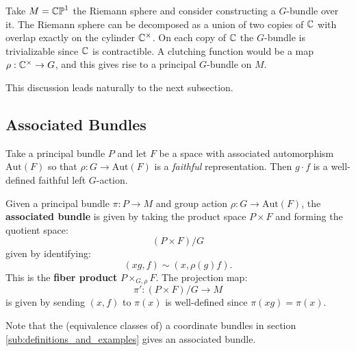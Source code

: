 		\begin{eg}
			Take $M = \mathbb{CP}^1$ the Riemann sphere and consider constructing a $G$-bundle over it. The Riemann sphere can be decomposed as a union of two copies of $\mathbb{C}$ with overlap exactly on the cylinder $\mathbb{C}^{\times}$. On each copy of $\mathbb{C}$ the $G$-bundle is trivializable since $\mathbb{C}$ is contractible. A clutching function would be a map $\rho: \mathbb{C}^\times \to G$, and this gives rise to a principal $G$-bundle on $M$. 
		\end{eg}
		
		This discussion leads naturally to the next subsection. 
		
		
		\subsection{Associated Bundles}
		Take a principal bundle $P$ and let $F$ be a space with associated automorphism $\mathrm{Aut}(F)$ so that $\rho: G \to \mathrm{Aut}(F)$ is a \emph{faithful} representation. Then $g \cdot f$ is a well-defined faithful left $G$-action.
		\begin{defn}
			Given a principal bundle $\pi: P \to M$ and group action $\rho: G \to \mathrm{Aut}(F)$, the \textbf{associated bundle} is given by taking the product space $P \times F$ and forming the quotient space:
			\[
				(P \times F) / G
			\]
			given by identifying:
			\[
				(x g, f) \sim (x, \rho(g) f).
			\]
			This is the \textbf{fiber product} $P \times_{G, \rho} F$. The projection map:
			\[
				\pi': (P \times F) / G \to M
			\]
			is given by sending $(x, f)$ to $\pi(x)$ is well-defined since $\pi(x g) = \pi(x)$.
		\end{defn}
		Note that the (equivalence classes of) a coordinate bundles in section \ref{sub:definitions_and_examples} gives an associated bundle.
		
